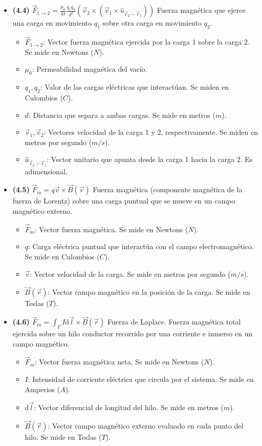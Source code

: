 \documentclass{article}
\begin{document}
\begin{itemize}
				\item \textbf{(4.4)} $\boxed{\vec{F}_{1\to2} = \frac{\mu_0}{4\pi} \frac{q_1 q_2}{d^2} (\vec{v}_2 \times (\vec{v}_1 \times \hat{u}_{\vec{r}_2-\vec{r}_1}))}$ Fuerza magnética que ejerce una carga en movimiento $q_1$ sobre otra carga en movimiento $q_2$.
					\begin{itemize}
						\item $\vec{F}_{1\to2}$: Vector fuerza magnética ejercida por la carga 1 sobre la carga 2. Se mide en Newtons ($N$).
						\item $\mu_0$: Permeabilidad magnética del vacío.
						\item $q_1, q_2$: Valor de las cargas eléctricas que interactúan. Se miden en Culombios ($C$).
						\item $d$: Distancia que separa a ambas cargas. Se mide en metros ($m$).
						\item $\vec{v}_1, \vec{v}_2$: Vectores velocidad de la carga 1 y 2, respectivamente. Se miden en metros por segundo ($m/s$).
						\item $\hat{u}_{\vec{r}_2-\vec{r}_1}$: Vector unitario que apunta desde la carga 1 hacia la carga 2. Es adimensional.
					\end{itemize}

				\item \textbf{(4.5)} $\boxed{\vec{F}_m = q\vec{v} \times \vec{B}(\vec{r})}$ Fuerza magnética (componente magnética de la fuerza de Lorentz) sobre una carga puntual que se mueve en un campo magnético externo.
					\begin{itemize}
						\item $\vec{F}_m$: Vector fuerza magnética. Se mide en Newtons ($N$).
						\item $q$: Carga eléctrica puntual que interactúa con el campo electromagnético. Se mide en Culombios ($C$).
						\item $\vec{v}$: Vector velocidad de la carga. Se mide en metros por segundo ($m/s$).
						\item $\vec{B}(\vec{r})$: Vector campo magnético en la posición de la carga. Se mide en Teslas ($T$).
					\end{itemize}

				\item \textbf{(4.6)} $\boxed{\vec{F}_m = \int_{\Gamma} I\mathrm{d}\vec{l} \times \vec{B}(\vec{r})}$ Fuerza de Laplace. Fuerza magnética total ejercida sobre un hilo conductor recorrido por una corriente e inmerso en un campo magnético.
					\begin{itemize}
						\item $\vec{F}_m$: Vector fuerza magnética neta. Se mide en Newtons ($N$).
						\item $I$: Intensidad de corriente eléctrica que circula por el sistema. Se mide en Amperios ($A$).
						\item $\mathrm{d}\vec{l}$: Vector diferencial de longitud del hilo. Se mide en metros ($m$).
						\item $\vec{B}(\vec{r})$: Vector campo magnético externo evaluado en cada punto del hilo. Se mide en Teslas ($T$).
					\end{itemize}


\end{itemize}
\end{document}
